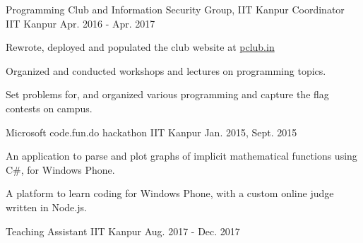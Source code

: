 \vspace{-0.3cm}


\begin{cventries}

  \extraentry
  {Programming Club and Information Security Group, IIT Kanpur}
  {Coordinator}
  {IIT Kanpur}
  {Apr. 2016 - Apr. 2017}
  {
    \begin{cvitems}
    \item Rewrote, deployed and populated the club website at \href{http://pclub.in}{pclub.in}
    \item Organized and conducted workshops and lectures on programming topics.
    \item Set problems for, and organized various programming and capture the flag
      contests on campus.
    \end{cvitems}
  }


  {Microsoft code.fun.do hackathon}
  {IIT Kanpur}
  {Jan. 2015, Sept. 2015}
  {
    \begin{cvitems}
    \item An application to parse and plot graphs of implicit
      mathematical functions using C\#, for Windows Phone.
    \item A platform to learn coding for Windows Phone, with a
      custom online judge written in Node.js.
    \end{cvitems}
  }

  {Teaching Assistant}
  {IIT Kanpur}
  {Aug. 2017 - Dec. 2017}
  {
  }
  \vspace{-0.3cm}


\end{cventries}

